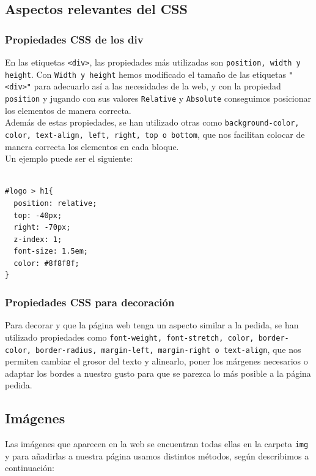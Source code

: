 \documentclass[10pt,a4paper]{article}
\begin{document}
\subsection{Aspectos relevantes del CSS}

\subsubsection{Propiedades CSS de los div}

En las etiquetas \texttt{<div>}, las propiedades más utilizadas son \texttt{position, width y height}. Con \texttt{Width y height} hemos modificado el tamaño de las etiquetas \texttt{"<div>"} para adecuarlo así a las necesidades de la web, y con la propiedad \texttt{position} y jugando con sus valores \texttt{Relative} y \texttt{Absolute} conseguimos posicionar los elementos de manera correcta.\\

Además de estas propiedades, se han utilizado otras como \texttt{background-color, color, text-align, left, right, top o bottom}, que nos facilitan colocar de manera correcta los elementos en cada bloque.\\

Un ejemplo puede ser el siguiente:

\begin{verbatim}

#logo > h1{
  position: relative;
  top: -40px;
  right: -70px;
  z-index: 1;
  font-size: 1.5em;
  color: #8f8f8f;
}

\end{verbatim}

\subsubsection{Propiedades CSS para decoración}

Para decorar y que la página web tenga un aspecto similar a la pedida, se han utilizado propiedades como \texttt{font-weight, font-stretch, color, border-color, border-radius, margin-left, margin-right o text-align}, que nos permiten cambiar el grosor del texto y alinearlo, poner los márgenes necesarios o adaptar los bordes a nuestro gusto para que se parezca lo más posible a la página pedida.


\subsection{Imágenes}

Las imágenes que aparecen en la web se encuentran todas ellas en la carpeta \texttt{img} y para añadirlas a nuestra página usamos distintos métodos, según describimos a continuación:\\
\end{document}
